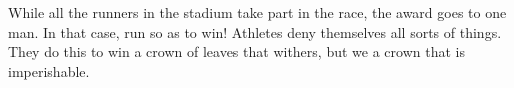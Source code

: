 \lettrine[lines=3]{W}{}hile all the runners in the stadium take part in the race, the award goes to one man. In that case, run so as to win! Athletes deny themselves all sorts of things. They do this to win a crown of leaves that withers, but we a crown that is imperishable.